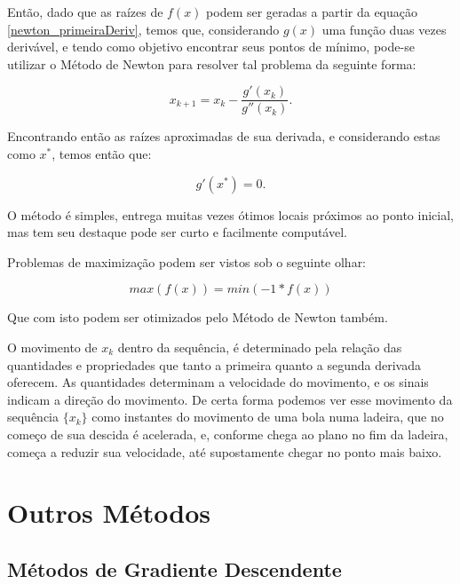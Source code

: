 
Então, dado que as raízes de $f(x)$ podem ser geradas a partir da equação
\ref{newton_primeiraDeriv}, temos que, considerando $g(x)$ uma função duas vezes
derivável, e tendo como objetivo encontrar seus pontos de mínimo, pode-se
utilizar o Método de Newton para resolver tal problema da seguinte forma:

\begin{equation}
    x_{k+1} = x_{k} - \frac {g'(x_{k})}{g''(x_{k})}.
\end{equation}

Encontrando então as raízes aproximadas de sua derivada, e considerando
estas como  $x^*$, temos então que:

\begin{equation}
    g'(x^*) = 0.
\end{equation}

O método é simples, entrega muitas vezes ótimos locais próximos ao ponto
inicial, mas tem seu destaque pode ser curto e facilmente computável.

Problemas de maximização podem ser vistos sob o seguinte olhar:

\begin{equation}
    max(f(x)) = min(-1 * f(x))
\end{equation}

Que com isto podem ser otimizados pelo Método de Newton também.

O movimento de \(x_k\) dentro da sequência, é determinado pela relação das
quantidades e propriedades que tanto a primeira quanto a segunda derivada
oferecem. As quantidades determinam a velocidade do movimento, e os sinais
indicam a direção do movimento. De certa forma podemos ver esse movimento da
sequência \(\{x_k\}\) como instantes do movimento de uma bola numa ladeira, que
no começo de sua descida é acelerada, e, conforme chega ao plano no fim da
ladeira, começa a reduzir sua velocidade, até supostamente chegar no ponto mais
baixo.


\section{{Outros Métodos}}

\subsection{Métodos de Gradiente Descendente}

